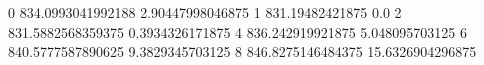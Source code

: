 0 834.0993041992188 2.90447998046875
1 831.19482421875 0.0
2 831.5882568359375 0.3934326171875
4 836.242919921875 5.048095703125
6 840.5777587890625 9.3829345703125
8 846.8275146484375 15.6326904296875
